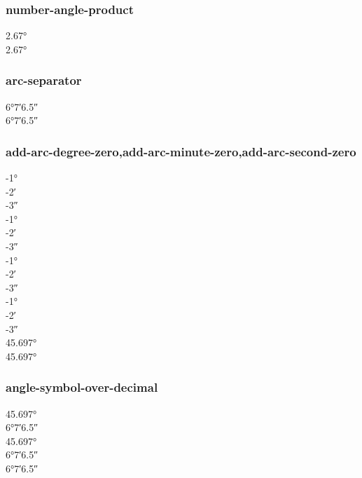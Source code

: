 \documentclass{article}
\begin{document}
\subsubsection{number-angle-product}
\ang{2.67} \\
\ang[number-angle-product = \,]{2.67}
\subsubsection{arc-separator}
\ang{6;7;6.5} \\
\ang[arc-separator = \,]{6;7;6.5}
\subsubsection{add-arc-degree-zero,add-arc-minute-zero,add-arc-second-zero}
\ang{-1;;} \\
\ang{;-2;} \\
\ang{;;-3} \\
{
\ang{-1;;} \\
\ang{;-2;} \\
\ang{;;-3} \\
}
{
\ang{-1;;} \\
\ang{;-2;} \\
\ang{;;-3} \\
}
{
\ang{-1;;} \\
\ang{;-2;} \\
\ang{;;-3}\\
}
\ang[add-arc-minute-zero,add-arc-second-zero]{45.697}\\
\ang[color=blue,add-arc-minute-zero,add-arc-second-zero]{45.697}\\

\subsubsection{angle-symbol-over-decimal}
\ang{45.697} \\
\ang{6;7;6.5} \\
\ang[angle-symbol-over-decimal]{45.697} \\
\ang[angle-symbol-over-decimal]{6;7;6.5}\\
\ang[color=blue,angle-symbol-over-decimal]{6;7;6.5}
\end{document}

